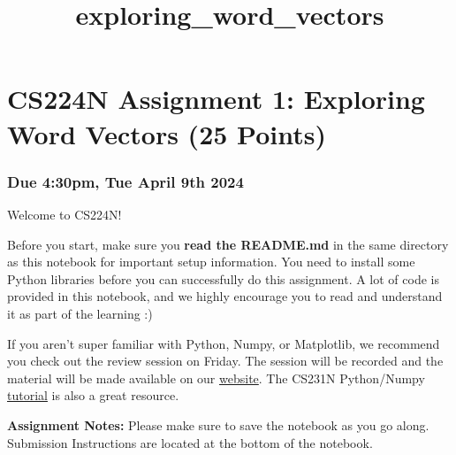 \documentclass[11pt]{article}
\title{exploring\_word\_vectors}
\begin{document}
    
    \maketitle
    
    

    
    \section{CS224N Assignment 1: Exploring Word Vectors (25
Points)}\label{cs224n-assignment-1-exploring-word-vectors-25-points}

\subsubsection{\texorpdfstring{ Due 4:30pm, Tue April 9th
2024}{ Due 4:30pm, Tue April 9th 2024}}\label{due-430pm-tue-april-9th-2024}

Welcome to CS224N!

Before you start, make sure you \textbf{read the README.md} in the same
directory as this notebook for important setup information. You need to
install some Python libraries before you can successfully do this
assignment. A lot of code is provided in this notebook, and we highly
encourage you to read and understand it as part of the learning :)

If you aren't super familiar with Python, Numpy, or Matplotlib, we
recommend you check out the review session on Friday. The session will
be recorded and the material will be made available on our
\href{http://web.stanford.edu/class/cs224n/index.html\#schedule}{website}.
The CS231N Python/Numpy
\href{https://cs231n.github.io/python-numpy-tutorial/}{tutorial} is also
a great resource.

\textbf{Assignment Notes:} Please make sure to save the notebook as you
go along. Submission Instructions are located at the bottom of the
notebook.
\end{document}
